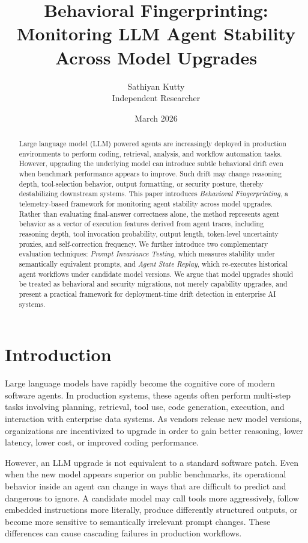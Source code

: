 \documentclass[11pt]{article}
\title{Behavioral Fingerprinting: Monitoring LLM Agent Stability Across Model Upgrades}
\author{Sathiyan Kutty \\
Independent Researcher}
\date{March 2026}
\begin{document}
\maketitle

\begin{abstract}
Large language model (LLM) powered agents are increasingly deployed in production environments to perform coding, retrieval, analysis, and workflow automation tasks. However, upgrading the underlying model can introduce subtle behavioral drift even when benchmark performance appears to improve. Such drift may change reasoning depth, tool-selection behavior, output formatting, or security posture, thereby destabilizing downstream systems. This paper introduces \emph{Behavioral Fingerprinting}, a telemetry-based framework for monitoring agent stability across model upgrades. Rather than evaluating final-answer correctness alone, the method represents agent behavior as a vector of execution features derived from agent traces, including reasoning depth, tool invocation probability, output length, token-level uncertainty proxies, and self-correction frequency. We further introduce two complementary evaluation techniques: \emph{Prompt Invariance Testing}, which measures stability under semantically equivalent prompts, and \emph{Agent State Replay}, which re-executes historical agent workflows under candidate model versions. We argue that model upgrades should be treated as behavioral and security migrations, not merely capability upgrades, and present a practical framework for deployment-time drift detection in enterprise AI systems.
\end{abstract}

\section{Introduction}
Large language models have rapidly become the cognitive core of modern software agents. In production systems, these agents often perform multi-step tasks involving planning, retrieval, tool use, code generation, execution, and interaction with enterprise data systems. As vendors release new model versions, organizations are incentivized to upgrade in order to gain better reasoning, lower latency, lower cost, or improved coding performance.

However, an LLM upgrade is not equivalent to a standard software patch. Even when the new model appears superior on public benchmarks, its operational behavior inside an agent can change in ways that are difficult to predict and dangerous to ignore. A candidate model may call tools more aggressively, follow embedded instructions more literally, produce differently structured outputs, or become more sensitive to semantically irrelevant prompt changes. These differences can cause cascading failures in production workflows.
\end{document}
